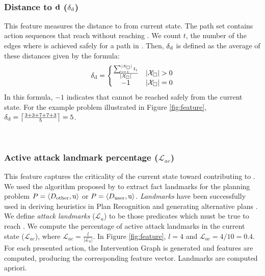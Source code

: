 ~\subsubsection{Distance to $\boldsymbol{\mathrm{d}}$ ($\delta_\mathrm{d}$)} 
This feature measures the distance to \desired from current state. The path set \SuffixesSafe contains action sequences that reach \desired without reaching \undesired.
We count  $t$, the number of the edges where \desired is achieved safely for a path in \SuffixesSafe. 
Then, $\delta_\mathrm{d}$ is defined as the average of these distances given by the formula:
\begin{equation*} 
\delta_\desired = \left\{\begin{matrix}
\frac{\sum_{i=1}^{|\SuffixesSafe|}t_i}{|\SuffixesSafe|} & |\SuffixesSafe|>0\\ 
-1 &  |\SuffixesSafe|=0
\end{matrix}\right.
\end{equation*}
In this formula, $-1$ indicates that \desired cannot be reached safely from the current state. For the example problem illustrated in Figure \ref{fig:feature}, $\delta_\mathrm{d}=\left \lceil \frac{3+3+7+7+3}{5} \right \rceil=5$.


~\subsubsection{Active attack landmark percentage ($\mathcal{L}_{ac}$)} 
This feature captures the criticality of the current state toward contributing to \undesired. 
We used the algorithm proposed by \cite{hoffman2004lm} to extract fact landmarks for the planning problem $P = \langle D_{\textnormal{other}}, \mathrm{u}\rangle$ or $P = \langle D_{\textnormal{user}}, \mathrm{u}\rangle$. 
{\em Landmarks} have been successfully used in deriving heuristics in Plan Recognition \cite{vered2018goalrec} and generating alternative plans \cite{bryce2014diverse}. 
We define  \textit{attack landmarks} ($\mathcal{L}_{u}$) to be those predicates which must be true to reach \undesired.    
We compute the percentage of active attack landmarks in the current state ($\mathcal{L}_{ac}$), where  $\mathcal{L}_{ac} = \frac{l}{\left |\mathcal{L}_{u}\right|}$.
In Figure \ref{fig:feature}, $l=4$ and $\mathcal{L}_{ac}=4/10=0.4$.
For each presented action, the Intervention Graph is generated and features are computed, producing the corresponding feature vector. 
Landmarks are computed apriori.

